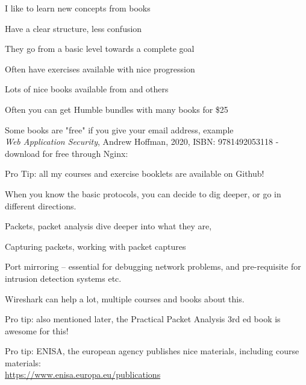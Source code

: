 \documentclass[Screen16to9,17pt]{foils}
\begin{document}
I like to learn new concepts from books
\begin{list2}
\item Have a clear structure, less confusion
\item They go from a basic level towards a complete goal
\item Often have exercises available with nice progression
\item Lots of nice books available from  and others
\item Often you can get Humble bundles with many books for \$25
\item Some books are "free" if you give your email address, example\\
\emph{Web Application Security}, Andrew Hoffman, 2020, ISBN: 9781492053118 - download for free through Nginx:\\
\end{list2}

Pro Tip: all my courses and exercise booklets are available on Github!


When you know the basic protocols, you can decide to dig deeper, or go in different directions.

\begin{list2}
\item Packets, packet analysis dive deeper into what they are,
\item Capturing packets, working with packet captures
\item Port mirroring -- essential for debugging network problems, and pre-requisite for intrusion detection systems etc.
\end{list2}

Wireshark can help a lot, multiple courses and books about this.

Pro tip: also mentioned later, the Practical Packet Analysis 3rd ed book is awesome for this!

Pro tip: ENISA, the european agency publishes nice materials, including course materials:\\
\url{https://www.enisa.europa.eu/publications}





\begin{quote}

\end{quote}
\end{document}
